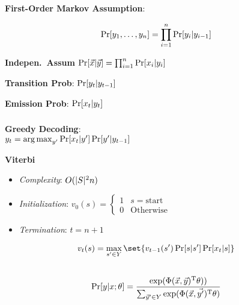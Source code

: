 \documentclass[9pt]{extarticle}
\renewcommand{\green}[1]{{\color{ForestGreen} #1}}
\newcommand{\greenbf}[1]{\textbf{\green{#1}}}
\begin{document}
\begin{multicols}{3}
  \greenbf{First-Order Markov Assumption}:

  \begin{equation*}
    \Pr\lbrack y_{1},\ldots,y_{n}\rbrack = \prod_{i=1}^{n} \Pr[y_{i} \vert y_{i-1}]
  \end{equation*}

  \greenbf{Indepen.\ Assum} $\Pr\lbrack\vec{x} \vert \vec{y}\rbrack = \prod_{i=1}^{n} \Pr[x_{i} \vert y_{i}]$

  \greenbf{Transition Prob}: $\Pr\lbrack y_{t} \vert y_{t-1}\rbrack$

  \greenbf{Emission Prob}: $\Pr\lbrack x_{t} \vert y_{t}\rbrack$

  \subsubsection*{}

  \greenbf{Greedy Decoding}: \\${y_t = \operatorname*{arg\,max}_{y'} \Pr[x_t \vert y'] \Pr[y' \vert y_{t-1}]}$

  \greenbf{Viterbi}
  \begin{itemize}
    \item \textit{Complexity}: $O(\lvert S\rvert^{2} n)$
    \item \textit{Initialization}: $v_0(s) = \begin{cases}
                                               1 & s = \text{start} \\
                                               0 & \text{Otherwise}
                                             \end{cases}$
    \item \textit{Termination}: $t = n+1$
  \end{itemize}

  \begin{equation*}
    v_{t}(s) = \max_{s' \in Y}\set{v_{t-1}(s') \Pr[s \vert s'] \Pr[x_t \vert s]}
  \end{equation*}

  \subsection*{}
  \subsection*{}

  \begin{equation*}
    \Pr[y \vert x; \theta] = \frac{\exp(\Phi(\vec{x},\vec{y})^{\text{T}}\theta))}{\sum_{\vec{y}' \in Y} \exp(\Phi(\vec{x}, \vec{y'})^{\text{T}}\theta)}
  \end{equation*}


\end{multicols}
\end{document}
